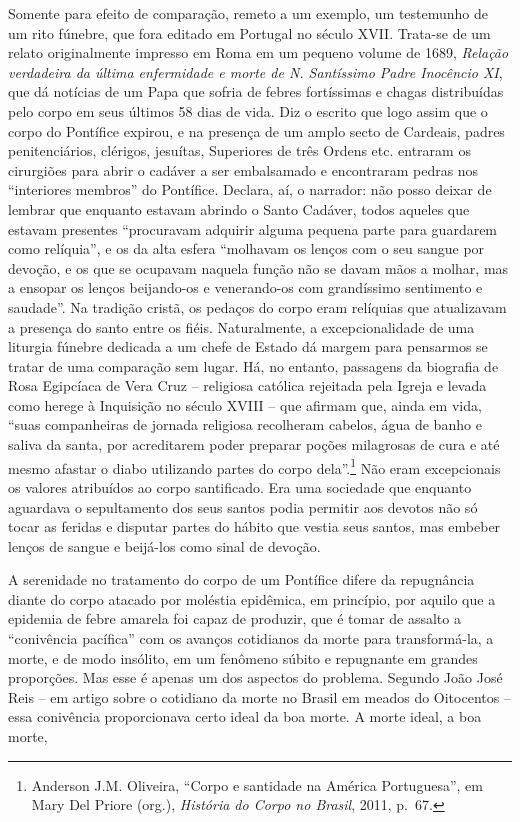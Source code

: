 Somente para efeito de comparação, remeto a um exemplo, um testemunho de
um rito fúnebre, que fora editado em Portugal no século XVII. Trata-se
de um relato originalmente impresso em Roma em um pequeno volume de
1689, \emph{Relação verdadeira da última enfermidade e morte de N.
Santíssimo Padre Inocêncio XI}, que dá notícias de um Papa que sofria de
febres fortíssimas e chagas distribuídas pelo corpo em seus últimos 58
dias de vida. Diz o escrito que logo assim que o corpo do Pontífice
expirou, e na presença de um amplo secto de Cardeais, padres
penitenciários, clérigos, jesuítas, Superiores de três Ordens etc.
entraram os cirurgiões para abrir o cadáver a ser embalsamado e
encontraram pedras nos ``interiores membros'' do Pontífice. Declara, aí,
o narrador: não posso deixar de lembrar que enquanto estavam abrindo o
Santo Cadáver, todos aqueles que estavam presentes ``procuravam adquirir
alguma pequena parte para guardarem como relíquia'', e os da alta esfera
``molhavam os lenços com o seu sangue por devoção, e os que se ocupavam
naquela função não se davam mãos a molhar, mas a ensopar os lenços
beijando-os e venerando-os com grandíssimo sentimento e saudade''. Na
tradição cristã, os pedaços do corpo eram relíquias que atualizavam a
presença do santo entre os fiéis. Naturalmente, a excepcionalidade de
uma liturgia fúnebre dedicada a um chefe de Estado dá margem para
pensarmos se tratar de uma comparação sem lugar. Há, no entanto,
passagens da biografia de Rosa Egipcíaca de Vera Cruz -- religiosa
católica rejeitada pela Igreja e levada como herege à Inquisição no
século XVIII -- que afirmam que, ainda em vida, ``suas companheiras de
jornada religiosa recolheram cabelos, água de banho e saliva da santa,
por acreditarem poder preparar poções milagrosas de cura e até mesmo
afastar o diabo utilizando partes do corpo dela''.\footnote{Anderson
  J.M. Oliveira, ``Corpo e santidade na América Portuguesa'', em Mary
  Del Priore (org.), \emph{História do Corpo no Brasil}, 2011, p.~67.}
Não eram excepcionais os valores atribuídos ao corpo santificado. Era
uma sociedade que enquanto aguardava o sepultamento dos seus santos
podia permitir aos devotos não só tocar as feridas e disputar partes do
hábito que vestia seus santos, mas embeber lenços de sangue e beijá-los
como sinal de devoção.

A serenidade no tratamento do corpo de um Pontífice difere da
repugnância diante do corpo atacado por moléstia epidêmica, em
princípio, por aquilo que a epidemia de febre amarela foi capaz de
produzir, que é tomar de assalto a ``conivência pacífica'' com os
avanços cotidianos da morte para transformá-la, a morte, e de modo
insólito, em um fenômeno súbito e repugnante em grandes proporções. Mas
esse é apenas um dos aspectos do problema. Segundo João José Reis -- em
artigo sobre o cotidiano da morte no Brasil em meados do Oitocentos --
essa conivência proporcionava certo ideal da boa morte. A morte ideal, a
boa morte,

